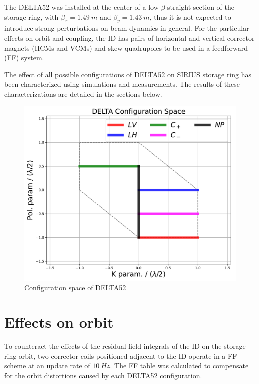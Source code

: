 \documentclass[a4paper,
               keeplastbox,   %
               ]{jacow}
\begin{document}
The DELTA52 was installed at the center of a low-$\beta$ straight section of the storage ring, with $\beta_{x} = \SI{1.49}{m}$ and $\beta_{y} = \SI{1.43}{m}$, thus it is not expected to introduce strong perturbations on beam dynamics in general. For the particular effects on orbit and coupling, the ID has pairs of horizontal and vertical corrector magnets (HCMs and VCMs) and skew quadrupoles to be used in a feedforward (FF) system. 

The effect of all possible configurations of DELTA52 on SIRIUS storage ring has been characterized using simulations and measurements. The results of these characterizations are detailed in the sections below.

\begin{figure}[]
    \centering
   \includegraphics[width=.6\columnwidth]{THPS18_f1.pdf}
   \caption{Configuration space of DELTA52}
   \label{fig:config_space}
\end{figure}

\section{Effects on orbit}

To counteract the effects of the residual field integrals of the ID on the storage ring orbit, two corrector coils positioned adjacent to the ID operate in a FF scheme at an update rate of $\SI{10}{Hz}$. The FF table was calculated to compensate for the orbit distortions caused by each DELTA52 configuration.
\end{document}
